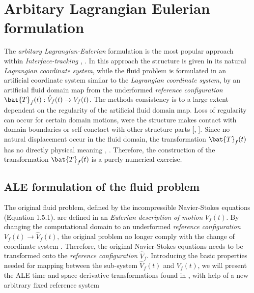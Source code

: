 \newpage
\section{Arbitary Lagrangian Eulerian formulation}
The \textit{arbitary Lagrangian-Eulerian} formulation is the most popular approach within \textit{Interface-tracking} \cite{Richter2010a}, \cite{Frei2016}. In this approach the structure is given in its natural \textit{Lagrangian coordinate system}, while the fluid problem is formulated in an artificial coordinate system similar to the \textit{Lagrangian coordinate system}, by an artificial fluid domain map from the underformed \textit{reference configuration} $\bat{T}_f (t): \hat{V}_f (t) \rightarrow V_f (t)$. The methods consistency is to a large extent dependent on the regularity of the artificial fluid domain map. Loss of regularity can occur for certain domain motions, were the structure makes contact with domain boundaries or self-conctact with other structure parts  [\cite{Wriggers2006}, \cite{Richter2016}].  Since no natural displacement occur in the fluid domain, the transformation $\bat{T}_f (t)$ has no directly physical meaning \cite{Richter2010a}, \cite{Donea2004}. Therefore, the construction of the transformation $\bat{T}_f (t)$ is a purely numerical exercise.
\newpage
\subsection{ALE formulation of the fluid problem}
The original fluid problem, defined by the incompressible Navier-Stokes equations (Equation 1.5.1). are defined in an \textit{Eulerian description of motion} $V_f (t)$. By changing the computational domain to an underformed \textit{reference configuration} $V_f (t) \rightarrow \hat{V}_f (t)$, the original problem no longer comply with the change of coordinate system . Therefore,  the original Navier-Stokes equations needs to be transformed onto the  \textit{reference configuration} $\hat{V}_f $.
Introducing the basic properties needed for mapping between the sub-system $\hat{V}_f (t)$ and $V_f (t)$, we will present the ALE  time and space derivative transformations found in \cite{Richter2016}, with help of a new arbitrary fixed reference system  

